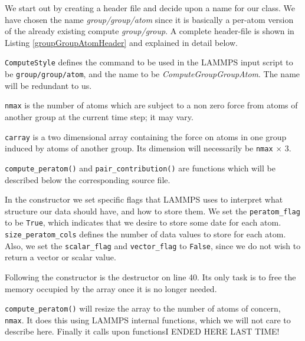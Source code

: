 \documentclass[twoside,english]{uiofysmaster}
\begin{document}
We start out by creating a header file and decide upon a name for our class. We have chosen the name \textit{group/group/atom} since it is basically a per-atom version of the already existing compute \textit{group/group}. A complete header-file is shown in Listing \ref{groupGroupAtomHeader} and explained in detail below.



\texttt{ComputeStyle} defines the command to be used in the LAMMPS input script to be \texttt{group/group/atom}, and the name to be \textit{ComputeGroupGroupAtom}. The name will be redundant to us. 

\texttt{nmax} is the number of atoms which are subject to a non zero force from atoms of another group at the current time step; it may vary.

\texttt{carray} is a two dimensional array containing the force on atoms in one group induced by atoms of another group. Its dimension will necessarily be \texttt{nmax} $\times$ 3.

\texttt{compute\_peratom()} and \texttt{pair\_contribution()} are functions which will be described below the corresponding source file. 





In the constructor we set specific flags that LAMMPS uses to interpret what structure our data should have, and how to store them. 
We set the \texttt{peratom\_flag} to be \texttt{True}, which indicates that we desire to store some date for each atom. 
\texttt{size\_peratom\_cols} defines the number of data values to store for each atom. 
Also, we set the \texttt{scalar\_flag} and \texttt{vector\_flag} to \texttt{False}, since we do not wish to return a vector or scalar value.

Following the constructor is the destructor on line 40. Its only task is to free the memory occupied by the array once it is no longer needed.  

\texttt{compute\_peratom()} will resize the array to the number of atoms of concern, \texttt{nmax}. It does this using LAMMPS internal functions, which we will not care to describe here. Finally it calls upon functions{\huge  I ENDED HERE LAST TIME!}
\end{document}
